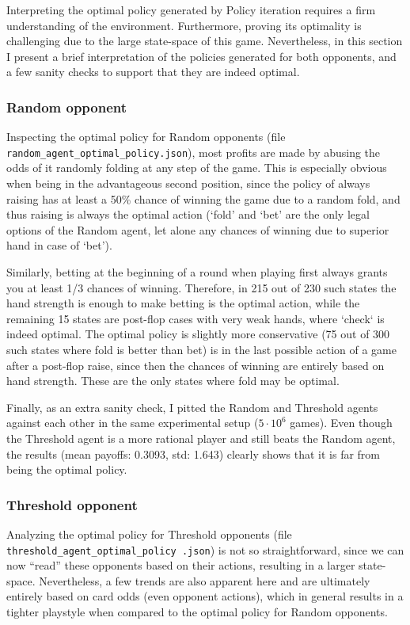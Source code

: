 Interpreting the optimal policy generated by Policy iteration requires a firm understanding of the environment. Furthermore, proving its optimality is challenging due to the large state-space of this game. Nevertheless, in this section I present a brief interpretation of the policies generated for both opponents, and a few sanity checks to support that they are indeed optimal.

\subsubsection{Random opponent}

Inspecting the optimal policy for Random opponents (file \Verb|random_agent_optimal_policy.json|), most profits are made by abusing the odds of it randomly folding at any step of the game. This is especially obvious when being in the advantageous second position, since the policy of always raising has at least a 50\% chance of winning the game due to a random fold, and thus raising is always the optimal action (`fold' and `bet' are the only legal options of the Random agent, let alone any chances of winning due to superior hand in case of `bet').

Similarly, betting at the beginning of a round when playing first always grants you at least 1/3 chances of winning. Therefore, in 215 out of 230 such states the hand strength is enough to make betting is the optimal action, while the remaining 15 states are post-flop cases with very weak hands, where `check` is indeed optimal. The optimal policy is slightly more conservative (75 out of 300 such states where fold is better than bet) is in the last possible action of a game after a post-flop raise, since then the chances of winning are entirely based on hand strength. These are the only states where fold may be optimal.

Finally, as an extra sanity check, I pitted the Random and Threshold agents against each other in the same experimental setup ($5\cdot10^6$ games). Even though the Threshold agent is a more rational player and still beats the Random agent, the results (mean payoffs: 0.3093, std: 1.643) clearly shows that it is far from being the optimal policy.

\subsubsection{Threshold opponent}

Analyzing the optimal policy for Threshold opponents (file \texttt{threshold\_agent\_optimal\_policy .json}) is not so straightforward, since we can now ``read'' these opponents based on their actions, resulting in a larger state-space. Nevertheless, a few trends are also apparent here and are ultimately entirely based on card odds (even opponent actions), which in general results in a tighter playstyle when compared to the optimal policy for Random opponents. 

